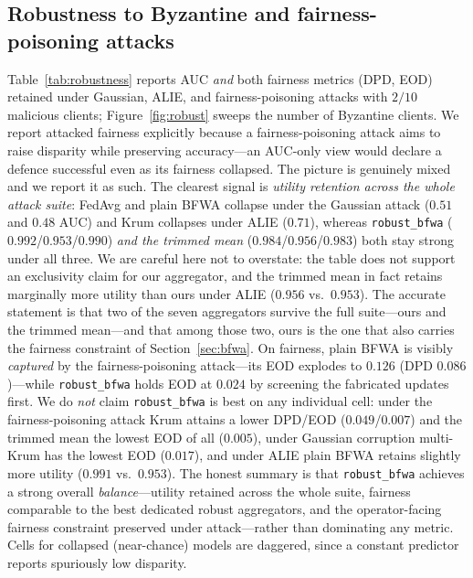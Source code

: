 \documentclass[pdflatex,sn-mathphys-num]{sn-jnl}
\theoremstyle{thmstyleone}%
\theoremstyle{thmstyletwo}%
\theoremstyle{thmstylethree}%
\begin{document}
\subsection{Robustness to Byzantine and fairness-poisoning attacks}
\label{sec:exp-robust}
Table~\ref{tab:robustness} reports AUC \emph{and} both fairness metrics (DPD,
EOD) retained under Gaussian, ALIE, and fairness-poisoning attacks with $2/10$
malicious clients; Figure~\ref{fig:robust} sweeps the number of Byzantine
clients. We report attacked fairness explicitly because a fairness-poisoning
attack aims to raise disparity while preserving accuracy---an AUC-only view would
declare a defence successful even as its fairness collapsed. The picture is
genuinely mixed and we report it as such. The clearest signal is
\emph{utility retention across the whole attack suite}: FedAvg and plain BFWA
collapse under the Gaussian attack ($0.51$ and $0.48$ AUC) and Krum collapses
under ALIE ($0.71$), whereas \texttt{robust\_bfwa}
($0.992$/$0.953$/$0.990$) \emph{and the trimmed mean} ($0.984$/$0.956$/$0.983$)
both stay strong under all three. We are careful here not to overstate: the
table does not support an exclusivity claim for our aggregator, and the trimmed
mean in fact retains marginally more utility than ours under ALIE ($0.956$ vs.\
$0.953$). The accurate statement is that two of the seven aggregators survive
the full suite---ours and the trimmed mean---and that among those two, ours is
the one that also carries the fairness constraint of
Section~\ref{sec:bfwa}. On fairness, plain
BFWA is visibly \emph{captured} by the fairness-poisoning attack---its EOD
explodes to $0.126$ (DPD $0.086$)---while \texttt{robust\_bfwa} holds EOD at
$0.024$ by screening the fabricated updates first. We do \emph{not} claim
\texttt{robust\_bfwa} is best on any individual cell: under the
fairness-poisoning attack Krum attains a lower DPD/EOD ($0.049$/$0.007$) and the
trimmed mean the lowest EOD of all ($0.005$), under Gaussian corruption
multi-Krum has the lowest EOD ($0.017$), and under ALIE plain BFWA retains
slightly more utility ($0.991$ vs.\ $0.953$). The honest summary is that
\texttt{robust\_bfwa} achieves a strong overall \emph{balance}---utility
retained across the whole suite, fairness comparable to the best dedicated
robust aggregators, and the operator-facing fairness constraint preserved under
attack---rather than dominating any metric. Cells for
collapsed (near-chance) models are daggered, since a constant predictor reports
spuriously low disparity.
\end{document}
